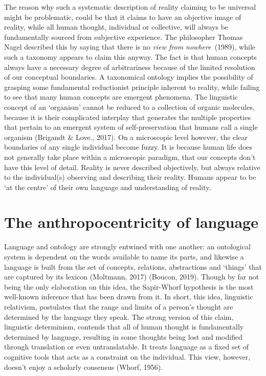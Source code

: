 The reason why such a systematic description of reality claiming to be universal might be problematic, could be that it claims to have an objective image of reality, while all human thought, individual or collective, will always be fundamentally sourced from subjective experience. The philosopher Thomas Nagel described this by saying that there is no \textit{view from nowhere}\ (1989), while such a taxonomy appears to claim this anyway. The fact is that human concepts always have a necessary degree of arbitrariness because of the limited resolution of our conceptual boundaries. A taxonomical ontology implies the possibility of grasping some fundamental reductionist principle inherent to reality, while failing to see that many human concepts are emergent phenomena. The linguistic concept of an ‘organism’ cannot be reduced to a collection of organic molecules, because it is their complicated interplay that generates the multiple properties that pertain to an emergent system of self-preservation that humans call a single organism (Brigandt \& Love., 2017). On a microscopic level however, the clear boundaries of any single individual become fuzzy. It is because human life does not generally take place within a microscopic paradigm, that our concepts don’t have this level of detail. Reality is never described objectively, but always relative to the individual(s) observing and describing their reality. Humans appear to be ‘at the centre’ of their own language and understanding of reality. 

\section{The anthropocentricity of language}

Language and ontology are strongly entwined with one another: an ontological system is dependent on the words available to name its parts, and likewise a language is built from the set of concepts, relations, abstractions and ‘things’ that are captured by its lexicon  (Moltmann, 2017) (Boucon, 2019). Though by far not being the only elaboration on this idea, the Sapir-Whorf hypothesis is the most well-known inference that has been drawn from it. In short, this idea, linguistic relativism, postulates that the range and limits of a person’s thought are determined by the language they speak. The strong version of this claim, linguistic determinism, contends that all of human thought is fundamentally determined by language, resulting in some thoughts being lost and modified through translation or even untranslatable. It treats language as a fixed set of cognitive tools that acts as a constraint on the individual. This view, however, doesn’t enjoy a scholarly consensus (Whorf, 1956).  

